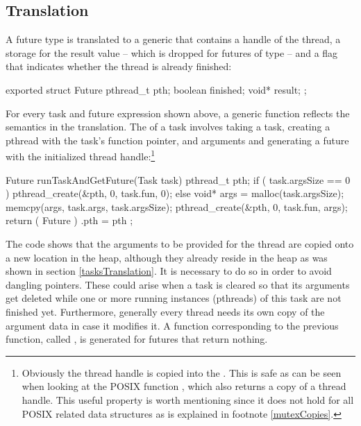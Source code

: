 \subsection{Translation}
\label{futuresTranslation}
A future type  is translated to a generic  that contains a handle of the thread, a storage for the result value -- which is dropped for futures of type  -- and a flag that indicates whether the thread is already finished:
\begin{ccode}
exported struct Future { 
  pthread_t pth; 
  boolean finished; 
  void* result; 
};
\end{ccode}

For every task and future expression shown above, a generic function reflects the semantics in the translation. The  of a task involves taking a task, creating a pthread with the task's function pointer, and arguments and generating a future with the initialized thread handle:\footnote{Obviously the thread handle is copied into the . This is safe as can be seen when looking at the POSIX function , which also returns a copy of a thread handle. This useful property is worth mentioning since it does not hold for all POSIX related data structures as is explained in footnote \ref{mutexCopies}.}
\begin{ccode}
Future runTaskAndGetFuture(Task task) { 
  pthread_t pth;
  if ( task.argsSize == 0 ) {
      pthread_create(&pth, 0, task.fun, 0);
  } else {
    void* args = malloc(task.argsSize);
    memcpy(args, task.args, task.argsSize);
    pthread_create(&pth, 0, task.fun, args);
  }
  return ( Future ){ .pth = pth }; 
}
\end{ccode}
The code shows that the arguments to be provided for the thread are copied onto a new location in the heap, although they already reside in the heap as was shown in section \ref{tasksTranslation}. It is necessary to do so in order to avoid dangling pointers. These could arise when a task is cleared so that its arguments get deleted while one or more running instances (pthreads) of this task are not finished yet. Furthermore, generally every thread needs its own copy of the argument data in case it modifies it. A function corresponding to the previous function, called , is generated for futures that return nothing. 


